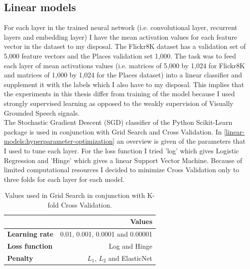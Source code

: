 \documentclass[a4paper, oneside]{book}
\begin{document}
\subsection{Linear models}\label{models:linear-models}

For each layer in the trained neural network (i.e. convolutional layer, recurrent layers and embedding layer) I have the mean activation values for each feature vector in the dataset to my disposal. The Flickr8K dataset has a validation set of 5,000 feature vectors and the Places validation set 1,000. The task was to feed each layer of mean activations values (i.e. matrices of 5,000 by 1,024 for Flickr8K and matrices of 1,000 by 1,024 for the Places dataset) into a linear classifier and supplement it with the labels which I also have to my disposal. This implies that the experiments in this thesis differ from training of the model because I used strongly supervised learning as opposed to the weakly supervision of Visually Grounded Speech signals. \\

The Stochastic Gradient Descent (SGD) classifier of the Python Scikit-Learn package is used in conjunction with Grid Search and Cross Validation. In \autoref{linear-models:hyperparameter-optimization} an overview is given of the parameters that I used to tune each layer. For the loss function I tried 'log' which gives Logistic Regression and 'Hinge' which gives a linear Support Vector Machine. Because of limited computational resources I decided to minimize Cross Validation only to three folds for each layer for each model. 

\begin{table}[H]
\begin{center}
\begin{tabular}{|l|r|}
\hline              & \bf Values                        \\ \hline
\bf Learning rate   & 0.01, 0.001, 0.0001 and 0.00001   \\ \hline
\bf Loss function   & Log and Hinge                     \\ \hline
\bf Penalty         & $L_{1}$, $L_{2}$ and ElasticNet   \\ 
\hline
\end{tabular}
\end{center}
\caption{\label{linear-models:hyperparameter-optimization} Values used in Grid Search in conjunction with K-fold Cross Validation.  }
\end{table}
\end{document}

